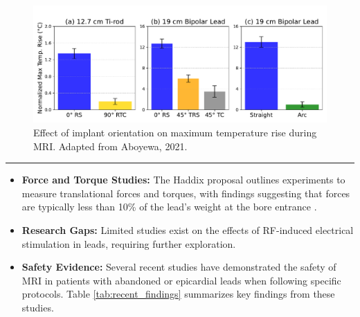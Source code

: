 \documentclass[final]{article}
\newcommand{\posterSection}[1]{
    \noindent{
        \color{DarkBlue}
        \fontsize{50}{60}\bfseries #1
    }
    \vspace{0.5em}
    \hrule
    \vspace{1em}
}
\begin{document}
\begin{multicols}{3}
\begin{center}
\end{center}

\vspace{-3em} %


\begin{figure}[H]
    \centering
    \includegraphics[width=0.9\linewidth]{Figure_4_9_Implant_Configuration_Adjusted_Y_Small.pdf}
    \caption{Effect of implant orientation on maximum temperature rise during MRI. Adapted from Aboyewa, 2021.}
    \label{fig:implant_orientation}
\end{figure}

\posterSection{Recent Advancements}
\begin{itemize}
    \item \textbf{Force and Torque Studies:} The Haddix proposal outlines experiments to measure translational forces and torques, with findings suggesting that forces are typically less than 10\% of the lead's weight at the bore entrance \cite{haddix2022}.
    \item \textbf{Research Gaps:} Limited studies exist on the effects of RF-induced electrical stimulation in leads, requiring further exploration.
    \item \textbf{Safety Evidence:} Several recent studies have demonstrated the safety of MRI in patients with abandoned or epicardial leads when following specific protocols. Table \ref{tab:recent_findings} summarizes key findings from these studies.
\end{itemize}


\end{multicols}
\end{document}
